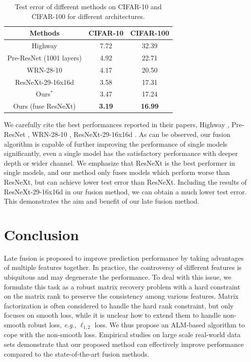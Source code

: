 \documentclass[letterpaper]{article} %
\def\eg{{\emph{e.g.}}}
\def\eg{\emph{eg}}
\def\eg{\emph{e.g}.} \def\Eg{\emph{E.g}.}
\begin{document}
\begin{table}[ht]
\centering
\begin{tabular}{|c|c|c|}\hline
    Methods              &  CIFAR-10       & CIFAR-100           \\\hline
Highway                  &   7.72          &  32.39              \\\hline
Pre-ResNet (1001 layers) &   4.92          &  22.71              \\\hline
WRN-28-10                &   4.17          &  20.50              \\\hline
ResNeXt-29-16x16d        &   3.58          &  17.31              \\\hline
Ours$^{*}$               &   3.47          &  17.24              \\\hline
Ours (fuse ResNeXt)      &   \textbf{3.19} &  \textbf{16.99}     \\\hline
\end{tabular}
\caption{Test error of different methods on CIFAR-10 and CIFAR-100 for different architectures.
}
\label{table:state_of_the_art}
\end{table}

We carefully cite the best performances reported in their papers, Highway \cite{srivastava2015highway}, Pre-ResNet \cite{he2016identity}, WRN-28-10 \cite{zagoruyko2016wide}, ResNeXt-29-16x16d \cite{xie2016aggregated}.
As can be observed, our fusion algorithm is capable of further improving the performance of single models significantly,
even a single model has the satisfactory performance with deeper depth or wider channel.
We emphasize that ResNeXt is the best performer in single models, and our method only fuses models which perform worse than ResNeXt, but can achieve lower test error than ResNeXt.
Including the results of ResNeXt-29-16x16d in our fusion method, we can obtain a much lower test error.
This demonstrates the aim and benefit of our late fusion method.


\section{Conclusion}

Late fusion is proposed to improve prediction performance by taking advantages of multiple features together.
In practice, the controversy of different features is ubiquitous and may degenerate the performance.
To deal with this issue, we formulate this task as a robust matrix recovery problem with a hard constraint on the matrix rank to preserve the consistency among various features.
Matrix factorization is often considered to handle the hard rank constraint, but only focuses on smooth loss, while it is unclear how to extend them to handle non-smooth robust loss, \eg, $\ell_{1,2}$ loss.
We thus propose an ALM-based algorithm to cope with the non-smooth loss.
Empirical studies on large scale real-world data sets demonstrate that our proposed method can effectively improve performance compared to the state-of-the-art fusion methods.


{
\footnotesize


}
\end{document}
